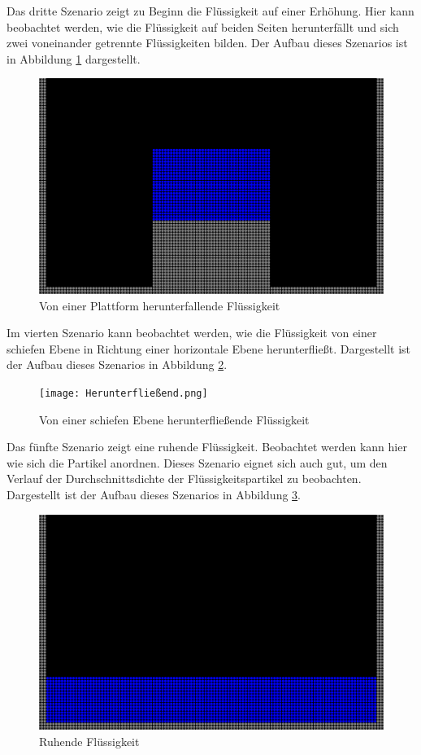 \documentclass{scrreprt}
\begin{document}
Das dritte Szenario zeigt zu Beginn die Flüssigkeit auf einer Erhöhung.
Hier kann beobachtet werden, wie die Flüssigkeit auf beiden Seiten herunterfällt und sich zwei voneinander getrennte Flüssigkeiten bilden.
Der Aufbau dieses Szenarios ist in Abbildung \ref{image:falling_fluid} dargestellt.
\begin{figure}[htb]
    \includegraphics[width=\textwidth]{Fallend.png}
    \caption{Von einer Plattform herunterfallende Flüssigkeit}
    \label{image:falling_fluid}
\end{figure}

Im vierten Szenario kann beobachtet werden, wie die Flüssigkeit von einer schiefen Ebene in Richtung einer horizontale Ebene herunterfließt.
Dargestellt ist der Aufbau dieses Szenarios in Abbildung \ref{image:flowing_fluid}.
\begin{figure}[htb]
    \texttt{[image: Herunterfließend.png]}
    \caption{Von einer schiefen Ebene herunterfließende Flüssigkeit}
    \label{image:flowing_fluid}
\end{figure}

Das fünfte Szenario zeigt eine ruhende Flüssigkeit.
Beobachtet werden kann hier wie sich die Partikel anordnen.
Dieses Szenario eignet sich auch gut, um den Verlauf der Durchschnittsdichte der Flüssigkeitspartikel zu beobachten.
Dargestellt ist der Aufbau dieses Szenarios in Abbildung \ref{image:resting_fluid}.
\begin{figure}[htb]
    \includegraphics[width=\textwidth]{Ruhend.png}
    \caption{Ruhende Flüssigkeit}
    \label{image:resting_fluid}
\end{figure}
\end{document}
